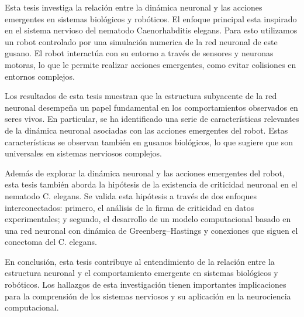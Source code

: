 \begin{resumen}%

Esta tesis investiga la relación entre la dinámica neuronal y las acciones emergentes en sistemas biológicos y robóticos. El enfoque principal esta inspirado en el sistema nervioso del nematodo Caenorhabditis elegans.  Para esto utilizamos un robot controlado por una simulación numerica de la red neuronal de este gusano.  El robot interactúa con su entorno a través de sensores y neuronas motoras, lo que le permite realizar acciones emergentes, como evitar colisiones en entornos complejos.

Los resultados de esta tesis muestran que la estructura subyacente de la red neuronal desempeña un papel fundamental en los comportamientos observados en seres vivos. En particular, se ha identificado una serie de características relevantes de la dinámica neuronal asociadas con las acciones emergentes del robot. Estas características se observan también en gusanos biológicos, lo que sugiere que son universales en sistemas nerviosos complejos.

Además de explorar la dinámica neuronal y las acciones emergentes del robot, esta tesis también aborda la hipótesis de la existencia de criticidad neuronal en el nematodo C. elegans. Se valida esta hipótesis a través de dos enfoques interconectados: primero, el análisis de la firma de criticidad en datos experimentales; y segundo, el desarrollo de un modelo computacional basado en una red neuronal con dinámica de Greenberg–Hastings y conexiones que siguen el conectoma del C. elegans.

En conclusión, esta tesis contribuye al entendimiento de la relación entre la estructura neuronal y el comportamiento emergente en sistemas biológicos y robóticos. Los hallazgos de esta investigación tienen importantes implicaciones para la comprensión de los sistemas nerviosos y su aplicación en la neurociencia computacional.




\end{resumen}
